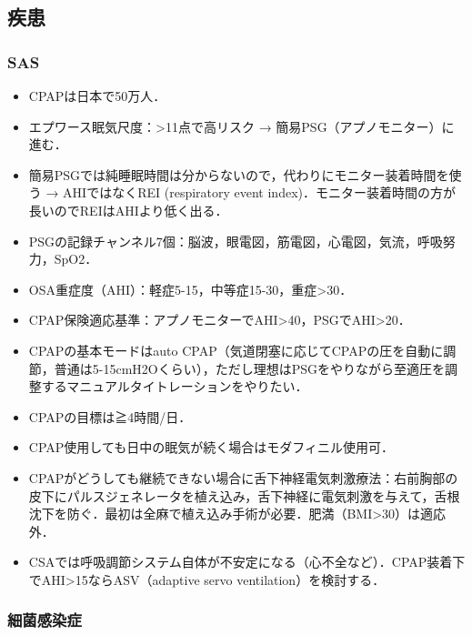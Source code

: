 \subsection{疾患}

\subsubsection{SAS}

\begin{itemize}
\item CPAPは日本で50万人．
\item エプワース眠気尺度：>11点で高リスク → 簡易PSG（アプノモニター）に進む．


\item 簡易PSGでは純睡眠時間は分からないので，代わりにモニター装着時間を使う → AHIではなくREI (respiratory event index)．モニター装着時間の方が長いのでREIはAHIより低く出る．
\item PSGの記録チャンネル7個：脳波，眼電図，筋電図，心電図，気流，呼吸努力，SpO2．


\item OSA重症度（AHI）：軽症5-15，中等症15-30，重症>30．
\item CPAP保険適応基準：アプノモニターでAHI>40，PSGでAHI>20．
\item CPAPの基本モードはauto CPAP（気道閉塞に応じてCPAPの圧を自動に調節，普通は5-15cmH2Oくらい），ただし理想はPSGをやりながら至適圧を調整するマニュアルタイトレーションをやりたい．
\item CPAPの目標は≧4時間/日．
\item CPAP使用しても日中の眠気が続く場合はモダフィニル使用可．
\item CPAPがどうしても継続できない場合に舌下神経電気刺激療法：右前胸部の皮下にパルスジェネレータを植え込み，舌下神経に電気刺激を与えて，舌根沈下を防ぐ．最初は全麻で植え込み手術が必要．肥満（BMI>30）は適応外．
\item CSAでは呼吸調節システム自体が不安定になる（心不全など）．CPAP装着下でAHI>15ならASV（adaptive servo ventilation）を検討する．
\end{itemize}


\subsubsection{細菌感染症}

